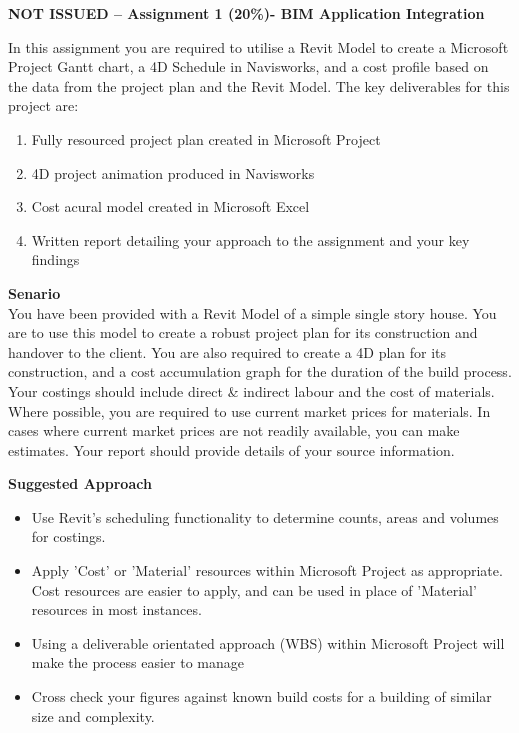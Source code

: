 
	
\begin{flushleft}
\Large\textbf{NOT ISSUED -- Assignment 1 (20\%)- BIM Application Integration}\\
\end{flushleft}

In this assignment you are required to utilise a Revit Model to create a Microsoft Project Gantt chart, a 4D Schedule in Navisworks, and a cost profile based on the data from the project plan and the Revit Model.  The key deliverables for this project are:

\begin{enumerate}
	\item Fully resourced project plan created in Microsoft Project
	\item 4D project animation produced in Navisworks
	\item Cost acural model created in Microsoft Excel
	\item Written report detailing your approach to the assignment and your key findings
\end{enumerate}

\textbf{Senario}\\


You have been provided with a Revit Model of a simple single story house.  You are to use this model to create a robust project plan for its construction and handover to the client.  You are also required to create a 4D plan for its construction, and a cost accumulation graph for the duration of the build process.  Your costings should include direct \& indirect labour and the cost of materials.  Where possible, you are required to use current market prices for materials.  In cases where current market prices are not readily available, you can make estimates.  Your report should provide details of your source information.





\vspace{.5cm}

\textbf{Suggested Approach}

\begin{itemize}
	\item Use Revit's scheduling functionality to determine counts, areas and volumes for costings.
	\item Apply 'Cost' or 'Material' resources within Microsoft Project as appropriate.  Cost resources are easier to apply, and can be used in place of 'Material' resources in most instances.
	\item Using a deliverable orientated approach (WBS) within Microsoft Project will make the process easier to manage
	\item Cross check your figures against known build costs for a building of similar size and complexity.

\end{itemize}

